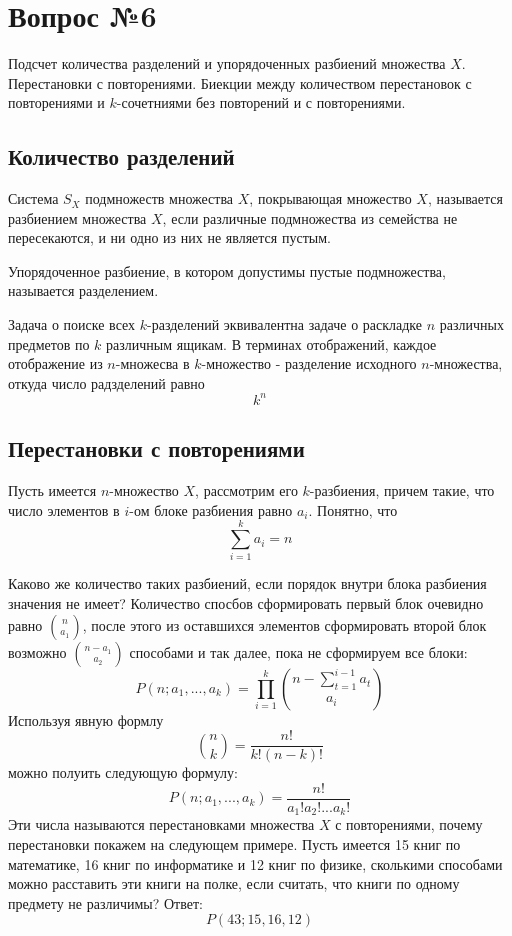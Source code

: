 \chapter{Вопрос №6}

Подсчет количества разделений и упорядоченных разбиений множества $X$. Перестановки с повторениями. Биекции между количеством перестановок с повторениями и $k$-сочетниями без повторений и с повторениями.

\section{Количество разделений}

Система $S_X$ подмножеств множества $X$, покрывающая множество $X$, называется разбиением множества $X$, если различные подмножества из семейства не пересекаются, и ни одно из них не является пустым.

Упорядоченное разбиение, в котором допустимы пустые подмножества, называется разделением.

Задача о поиске всех $k$-разделений эквивалентна задаче о раскладке $n$ различных предметов по $k$ различным ящикам. В терминах отображений, каждое отображение из $n$-множесва в $k$-множество - разделение исходного $n$-множества, откуда число радзделений равно $$ k^n $$

\section{Перестановки с повторениями}

Пусть имеется $n$-множество $X$, рассмотрим его $k$-разбиения, причем такие, что число элементов в $i$-ом блоке разбиения равно $a_i$. Понятно, что  $$ \sum_{i=1}^k a_i = n $$

Каково же количество таких разбиений, если порядок внутри блока разбиения значения не имеет? Количество спосбов сформировать первый блок очевидно равно $\binom{n}{a_1}$, после этого из оставшихся элементов сформировать второй блок возможно $\binom{n-a_1}{a_2}$ способами и так далее, пока не сформируем все блоки:
\begin{equation}
	P\left(n;a_1,...,a_k\right) = \prod_{i=1}^k \binom{n - \sum_{t=1}^{i-1} a_t}{a_i}
\end{equation}
Используя явную формлу
\begin{equation}
	\binom{n}{k} = \frac{n!}{k!\left(n-k\right)!}
\end{equation}
можно полуить следующую формулу:
\begin{equation}
	P\left(n;a_1,...,a_k\right) = \frac{n!}{a_1!a_2!...a_k!}
\end{equation}
Эти числа называются перестановками множества $X$ с повторениями, почему перестановки покажем на следующем примере. Пусть имеется 15 книг по математике, 16 книг по информатике и 12 книг по физике, сколькими способами можно расставить эти книги на полке, если считать, что книги по одному предмету не различимы? Ответ: $$ P\left(43; 15,16,12 \right) $$

